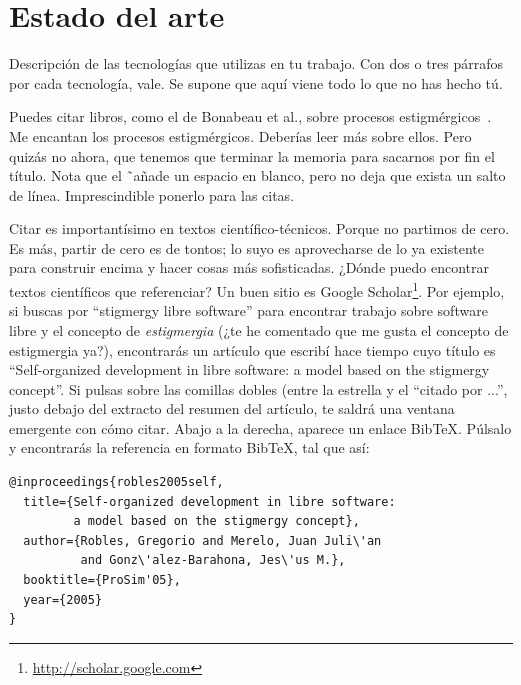 \documentclass[a4paper, 12pt]{book}
\begin{document}
\cleardoublepage


\chapter{Estado del arte}               %
\label{chap:tecnologias}

Descripción de las tecnologías que utilizas en tu trabajo. 
Con dos o tres párrafos por cada tecnología, vale. 
Se supone que aquí viene todo lo que no has hecho tú.

Puedes citar libros, como el de Bonabeau et al., sobre procesos estigmérgicos~\cite{bonabeau:_swarm}. 
Me encantan los procesos estigmérgicos.
Deberías leer más sobre ellos.
Pero quizás no ahora, que tenemos que terminar la memoria para sacarnos por fin el título.
Nota que el \~ \ añade un espacio en blanco, pero no deja que exista un salto de línea. 
Imprescindible ponerlo para las citas.

Citar es importantísimo en textos científico-técnicos. 
Porque no partimos de cero.
Es más, partir de cero es de tontos; lo suyo es aprovecharse de lo ya existente para construir encima y hacer cosas más sofisticadas.
¿Dónde puedo encontrar textos científicos que referenciar?
Un buen sitio es Google Scholar\footnote{\url{http://scholar.google.com}}.
Por ejemplo, si buscas por ``stigmergy libre software'' para encontrar trabajo sobre software libre y el concepto de \emph{estigmergia} (¿te he comentado que me gusta el concepto de estigmergia ya?), encontrarás un artículo que escribí hace tiempo cuyo título es ``Self-organized development in libre software: a model based on the stigmergy concept''.
Si pulsas sobre las comillas dobles (entre la estrella y el ``citado por ...'', justo debajo del extracto del resumen del artículo, te saldrá una ventana emergente con cómo citar.
Abajo a la derecha, aparece un enlace BibTeX.
Púlsalo y encontrarás la referencia en formato BibTeX, tal que así:

\clearpage
{\footnotesize
\begin{verbatim}
@inproceedings{robles2005self,
  title={Self-organized development in libre software:
         a model based on the stigmergy concept},
  author={Robles, Gregorio and Merelo, Juan Juli\'an 
          and Gonz\'alez-Barahona, Jes\'us M.},
  booktitle={ProSim'05},
  year={2005}
}
\end{verbatim}
}
\end{document}

